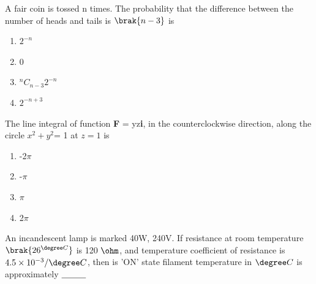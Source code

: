  \item A fair coin is tossed n times. The probability that the difference between the number of heads and tails is $\brak{n-3}$ is
 \begin{enumerate}
     \item $2^{-n}$
\item 0
\item $^{n}C_{n-3}2^{-n}$
\item $2^{-n+3}$
 \end{enumerate}
 \item The line integral of function \textbf{F} = yz\textbf{i}, in the counterclockwise direction, along the circle $x^{2} + y^{2}$= 1 at $z= 1$ is
\begin{enumerate}
    \item -2$\pi$
    \item -$\pi$
    \item $\pi$
    \item 2$\pi$
\end{enumerate}
\item An incandescent lamp is marked 40W, 240V. If resistance at room temperature $\brak{26^{\degree C}}$ is 120 $\ohm$, and temperature coefficient of resistance is $4.5\times 10^{-3}/\degree C$, then is 'ON' state filament temperature in $\degree C$ is approximately $\makebox[3cm][l]{\underline{\hspace{1cm}}}$

